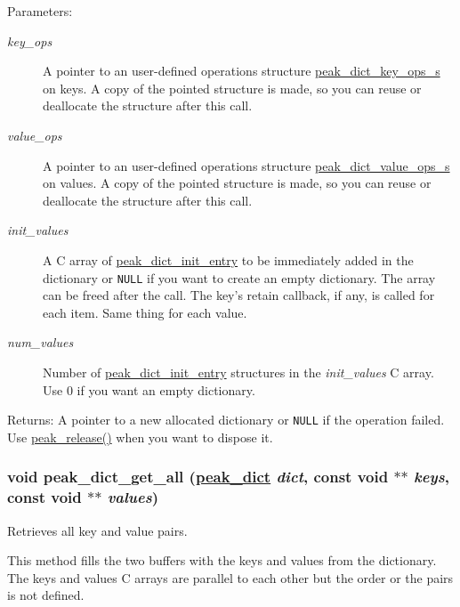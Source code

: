 \begin{Desc}
\item[Parameters:]
\begin{description}
\item[{\em key\_\-ops}]A pointer to an user-defined operations structure \hyperlink{structpeak__dict__key__ops__s}{peak\_\-dict\_\-key\_\-ops\_\-s} on keys. A copy of the pointed structure is made, so you can reuse or deallocate the structure after this call. \item[{\em value\_\-ops}]A pointer to an user-defined operations structure \hyperlink{structpeak__dict__value__ops__s}{peak\_\-dict\_\-value\_\-ops\_\-s} on values. A copy of the pointed structure is made, so you can reuse or deallocate the structure after this call. \item[{\em init\_\-values}]A C array of \hyperlink{structpeak__dict__init__entry}{peak\_\-dict\_\-init\_\-entry} to be immediately added in the dictionary or {\tt NULL} if you want to create an empty dictionary. The array can be freed after the call. The key's retain callback, if any, is called for each item. Same thing for each value. \item[{\em num\_\-values}]Number of \hyperlink{structpeak__dict__init__entry}{peak\_\-dict\_\-init\_\-entry} structures in the {\em init\_\-values\/} C array. Use 0 if you want an empty dictionary.\end{description}
\end{Desc}
\begin{Desc}
\item[Returns:]A pointer to a new allocated dictionary or {\tt NULL} if the operation failed. Use \hyperlink{group__alloc_ga7}{peak\_\-release()} when you want to dispose it. \end{Desc}
\hypertarget{group__dict_ga25}{
\subsubsection[peak\_\-dict\_\-get\_\-all]{\setlength{\rightskip}{0pt plus 5cm}void peak\_\-dict\_\-get\_\-all (\hyperlink{group__dict_ga0}{peak\_\-dict} {\em dict}, const void $\ast$$\ast$ {\em keys}, const void $\ast$$\ast$ {\em values})}}
\label{group__dict_ga25}


Retrieves all key and value pairs. 

This method fills the two buffers with the keys and values from the dictionary. The keys and values C arrays are parallel to each other but the order or the pairs is not defined.

